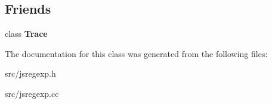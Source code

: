 \subsection*{Friends}
\begin{DoxyCompactItemize}
\item 
\hypertarget{classv8_1_1internal_1_1_trace_1_1_deferred_action_a9a7aa541dbcfdac34b25b49217ec39d7}{}class {\bfseries Trace}\label{classv8_1_1internal_1_1_trace_1_1_deferred_action_a9a7aa541dbcfdac34b25b49217ec39d7}

\end{DoxyCompactItemize}


The documentation for this class was generated from the following files\+:\begin{DoxyCompactItemize}
\item 
src/jsregexp.\+h\item 
src/jsregexp.\+cc\end{DoxyCompactItemize}
